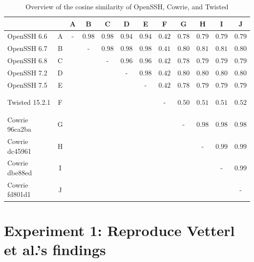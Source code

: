 \begin{table}
    \caption{Overview of the cosine similarity of OpenSSH, Cowrie, and Twisted}
    \begin{tabular}{lc|cccccccccc}
    \toprule
                   &   & A & B      & C      & D      & E      & F      & G      & H      & I      & J      \\
    \hline
    OpenSSH 6.6    & A & - & $0.98$ & $0.98$ & $0.94$ & $0.94$ & $0.42$ & $0.78$ & $0.79$ & $0.79$ & $0.79$ \\
    OpenSSH 6.7    & B &   & -      & $0.98$ & $0.98$ & $0.98$ & $0.41$ & $0.80$ & $0.81$ & $0.81$ & $0.80$ \\
    OpenSSH 6.8    & C &   &        & -      & $0.96$ & $0.96$ & $0.42$ & $0.78$ & $0.79$ & $0.79$ & $0.79$ \\
    OpenSSH 7.2    & D &   &        &        & -      & $0.98$ & $0.42$ & $0.80$ & $0.80$ & $0.80$ & $0.80$ \\
    OpenSSH 7.5    & E &   &        &        &        & -      & $0.42$ & $0.78$ & $0.79$ & $0.79$ & $0.79$ \\
    \\
    \cline{1-2} \cline{8-12}
    \\
    Twisted 15.2.1 & F &   &        &        &        &        & -      & $0.50$ & $0.51$ & $0.51$ & $0.52$ \\
    \\
    \cline{1-2} \cline{9-12}
    \\
    Cowrie 96ca2ba & G &   &        &        &        &        &        & -      & $0.98$ & $0.98$ & $0.98$ \\
    Cowrie dc45961 & H &   &        &        &        &        &        &        & -      & $0.99$ & $0.99$ \\
    Cowrie dbe88ed & I &   &        &        &        &        &        &        &        & -      & $0.99$ \\
    Cowrie fd801d1 & J &   &        &        &        &        &        &        &        &        & -      \\
    \bottomrule
    \end{tabular}
    \label{tab:cosine-similarity}
\end{table}

\section{Experiment 1: Reproduce Vetterl et al.'s findings}

